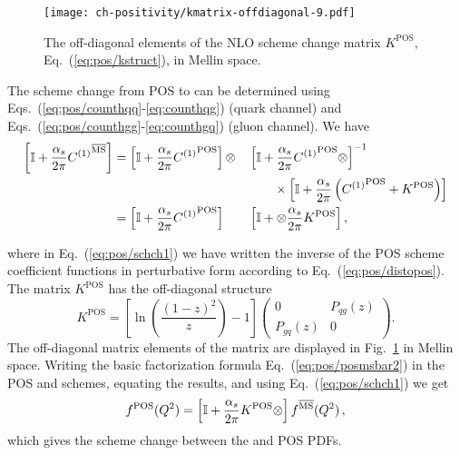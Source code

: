 \begin{figure}[t]
  \begin{center}
    \texttt{[image: ch-positivity/kmatrix-offdiagonal-9.pdf]}
    \caption{\small The off-diagonal  elements of the NLO scheme
      change matrix $K^{\textrm{POS}}$, Eq.~(\ref{eq:pos/kstruct}), in Mellin space.
    \label{fig:kmat} }
  \end{center}
\end{figure}
The scheme change from
POS to \msbar{} can be determined using Eqs.~(\ref{eq:pos/counthqq}-\ref{eq:counthqg}) (quark channel)
and Eqs.~(\ref{eq:pos/counthgg}-\ref{eq:counthgq}) (gluon channel).
We have
\begin{alignat}{2}
  \label{eq:pos/schch0}
\left[\mathbb{I}
+\frac{\alpha_s}{2\pi} {C^{(1)}}^{{\overline{\textrm{MS}}}}\right]&=
  \left[\mathbb{I} +\frac{\alpha_s}{2\pi} {C^{(1)}}^{\textrm{POS}}\right]\otimes
  &&\left[\mathbb{I} + \frac{\alpha_s}{2\pi} {C^{(1)}}^{\textrm{POS}}\otimes\right]^{-1}
  \nonumber\\
  & &&\qquad\times\left[\mathbb{I} +\frac{\alpha_s}{2\pi}  
    \left({C^{(1)}}^{\textrm{POS}} + K^{\textrm{POS}} \right)
  \right]\\
&=\left[\mathbb{I}
  +\frac{\alpha_s}{2\pi} {C^{(1)}}^{\textrm{POS}}
  \right]
  &&\left[\mathbb{I} + \otimes \frac{\alpha_s}{2\pi}  K^{\textrm{POS}}\right]
  , \label{eq:pos/schch1}
\end{alignat}

where in Eq.~(\ref{eq:pos/schch1}) we have written the inverse of the
POS scheme coefficient functions in perturbative form according to
Eq.~(\ref{eq:pos/distopos}). The matrix  $K^{\textrm{POS}}$ has the
off-diagonal structure
\begin{equation}\label{eq:pos/kstruct}
  K^{\textrm{POS}}=\left[\ln\left(\frac{(1-z)^2}{z}\right) - 1\right]
  \left(\begin{array}{cc} 0 & P_{qg}(z) \\
  P_{gq}(z) & 0\end{array}\right).
\end{equation}
The off-diagonal matrix elements of the matrix are displayed in
Fig.~\ref{fig:kmat} in Mellin space. 
Writing the basic factorization formula Eq.~(\ref{eq:pos/posmsbar2}) in
the POS and \msbar{} schemes, equating the results, and using
Eq.~(\ref{eq:pos/schch1}) we get
\begin{align}
  \label{eq:pos/schch}
 f^{\textrm{POS}}(Q^2)=\left[\mathbb{I}
  +\frac{\alpha_s}{2\pi}  K^{\textrm{POS}}\otimes\right] f^{{\overline{\textrm{MS}}}}(Q^2)\,,
\end{align}
which gives the scheme change between the \msbar{} and POS PDFs. 

